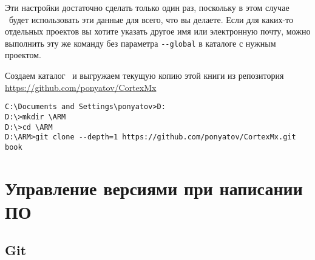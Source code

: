 \bigskip
Эти настройки достаточно сделать только один раз, поскольку в этом случае 
\git\ будет использовать эти данные для всего, что вы делаете.
 Если для каких-то отдельных проектов вы хотите указать другое имя или
электронную почту, можно выполнить эту же команду без параметра \verb|--global|
в каталоге с нужным проектом.

\bigskip
Создаем каталог \ и выгружаем текущую копию этой книги из репозитория
\url{https://github.com/ponyatov/CortexMx}

\bigskip{}

\bigskip
\begin{lstlisting}[style=con]
C:\Documents and Settings\ponyatov>D:
D:\>mkdir \ARM
D:\>cd \ARM
D:\ARM>git clone --depth=1 https://github.com/ponyatov/CortexMx.git book
\end{lstlisting}




\chapter{Управление версиями при написании ПО}

\section{Git}\label{git}\cite{progit}
